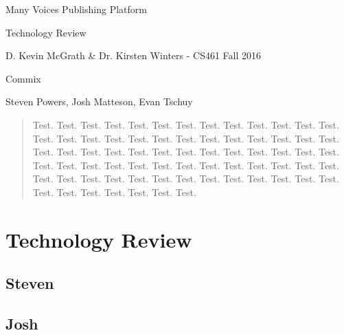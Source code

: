 \documentclass[letterpaper, 10pt, draftclsnofoot, compsoc, onecolumn]{IEEEtran}
\begin{document}
\begin{titlepage}
\centering
{\huge Many Voices Publishing Platform\par}
{\LARGE Technology Review\par}
{\vspace{5mm}}
{\large D. Kevin McGrath \& Dr. Kirsten Winters -  CS461 Fall 2016\par}
{\large Commix\par}
{\large Steven Powers, Josh Matteson, Evan Tschuy\par}
{\vspace{10mm}}

\begin{abstract}
\noindent Test. Test. Test. Test. Test. Test. Test. Test. Test. Test. Test. Test. Test. Test. Test. Test. Test. Test. Test. Test. Test. Test. Test. Test. Test. Test. Test. Test. Test. Test. Test. Test. Test. Test. Test. Test. Test. Test. Test. Test. Test. Test. Test. Test. Test. Test. Test. Test. Test. Test. Test. Test. Test. Test. Test. Test. Test. Test. Test. Test. Test. Test. Test. Test. Test. Test. Test. Test. Test. Test. Test. Test. 
\end{abstract}

\end{titlepage}

\tableofcontents

\newpage

\vspace{1pc}
\section{Technology Review}
\vspace{2pc}

\vspace{1pc}
\subsection{Steven}
\vspace{1pc}

{\noindent  \par}

\medskip

{\noindent \par}

\subsection{Josh}
\vspace{1pc}
\end{document}
